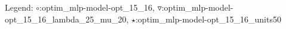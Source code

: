 Legend: {\color{blue}$\circ$}:optim\_mlp-model-opt\_15\_16, {\color{red}$\triangledown$}:optim\_mlp-model-opt\_15\_16\_lambda\_25\_mu\_20, {\color{cyan}$\star$}:optim\_mlp-model-opt\_15\_16\_units50